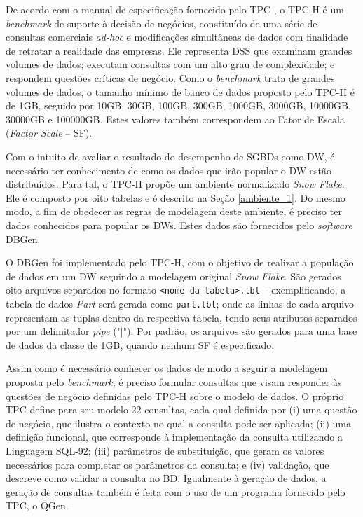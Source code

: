 De acordo com o manual de especificação fornecido pelo TPC \cite{tpc2017specs}, o TPC-H é um \textit{\textit{benchmark}} de suporte à decisão de negócios, constituído de uma série de consultas comerciais \textit{ad-hoc} e modificações simultâneas de dados com finalidade de retratar a realidade das empresas. Ele representa DSS que examinam grandes volumes de dados; executam consultas com um alto grau de complexidade; e respondem questões críticas de negócio. Como o \textit{\textit{benchmark}} trata de grandes volumes de dados, o tamanho mínimo de banco de dados proposto pelo TPC-H é de 1GB, seguido por 10GB, 30GB, 100GB, 300GB, 1000GB, 3000GB, 10000GB, 30000GB e 100000GB. Estes valores também correspondem ao Fator de Escala (\textit{Factor Scale} -- SF). 

Com o intuito de avaliar o resultado do desempenho de SGBDs como DW, é necessário ter conhecimento de como os dados que irão popular o DW estão distribuídos. Para tal, o TPC-H propõe um ambiente normalizado \textit{Snow Flake}. Ele é composto por oito tabelas e é descrito na Seção \ref{ambiente_1}. Do mesmo modo, a fim de obedecer as regras de modelagem deste ambiente, é preciso ter dados conhecidos para popular os DWs. Estes dados são fornecidos pelo \textit{software} DBGen.

O DBGen foi implementado pelo TPC-H, com o objetivo de realizar a população de dados em um DW seguindo a modelagem original \textit{Snow Flake}. São gerados oito arquivos separados no formato \texttt{<nome da tabela>.tbl} -- exemplificando, a tabela de dados \textit{Part} será gerada como \texttt{part.tbl}; onde as linhas de cada arquivo representam as tuplas dentro da respectiva tabela, tendo seus atributos separados por um delimitador \textit{pipe} ("$\mid$"). Por padrão, os arquivos são gerados para uma base de dados da classe de 1GB, quando nenhum SF é especificado.

Assim como é necessário conhecer os dados de modo a seguir a modelagem proposta pelo \textit{benchmark}, é preciso formular consultas que visam responder às questões de negócio definidas pelo TPC-H sobre o modelo de dados. O próprio TPC define para seu modelo 22 consultas, cada qual definida por (i) uma questão de negócio, que ilustra o contexto no qual a consulta pode ser aplicada; (ii) uma definição funcional, que corresponde à implementação da consulta utilizando a Linguagem SQL-92; (iii) parâmetros de substituição, que geram os valores necessários para completar os parâmetros da consulta; e (iv) validação, que descreve como validar a consulta no BD. Igualmente à geração de dados, a geração de consultas também é feita com o uso de um programa fornecido pelo TPC, o QGen.

